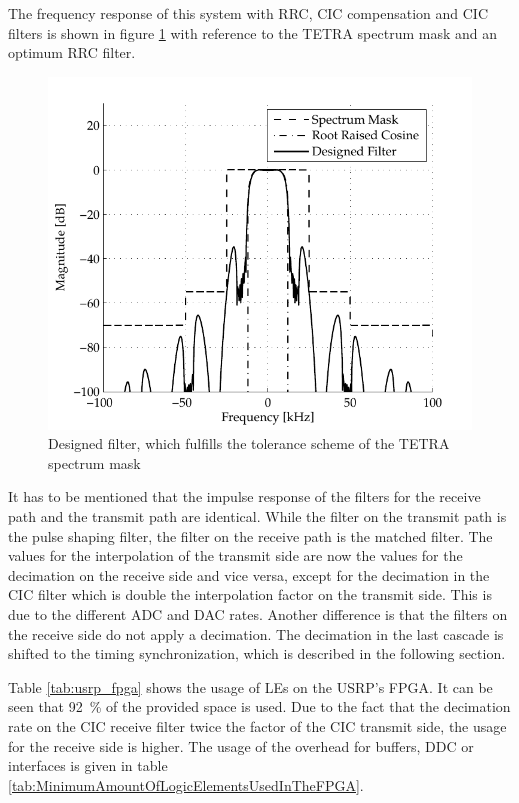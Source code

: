 The frequency response of this system with RRC, CIC compensation and CIC filters is shown in figure \ref{fig:tetra_usrp_resampling} with reference to the TETRA spectrum mask and an optimum RRC filter.

\begin{figure}[htb]
	\centering
		\includegraphics[width=1.00\textwidth]{../kapitel04/figures/tetra_usrp_resampling.pdf}
	\caption{Designed filter, which fulfills the tolerance scheme of the TETRA spectrum mask}
	\label{fig:tetra_usrp_resampling}
\end{figure}


It has to be mentioned that the impulse response of the filters for the receive path and the transmit path are identical. While the filter on the transmit path is the pulse shaping filter, the filter on the receive path is the matched filter. The values for the interpolation of the transmit side are now the values for the decimation on the receive side and vice versa, except for the decimation in the CIC filter which is double the interpolation factor on the transmit side. This is due to the different ADC and DAC rates. Another difference is that the filters on the receive side do not apply a decimation. The decimation in the last cascade is shifted to the timing synchronization, which is described in the following section.

Table \ref{tab:usrp_fpga} shows the usage of \acp{LE} on the USRP's FPGA. It can be seen that \SI{92}{\%} of the provided space is used. Due to the fact that the decimation rate on the CIC receive filter twice the factor of the CIC transmit side, the usage for the receive side is higher. The usage of the overhead for buffers, \acl{DDC} or interfaces is given in table \ref{tab:MinimumAmountOfLogicElementsUsedInTheFPGA}. 

